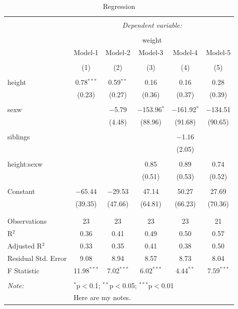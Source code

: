 \documentclass[
  doc]{apa6}
\begin{document}
\begin{table}[!htbp] \centering 
  \caption{Regression} 
  \label{} 
\small 
\begin{tabular}{@{\extracolsep{5pt}}lccccc} 
\\[-1.8ex]\hline 
\hline \\[-1.8ex] 
 & \multicolumn{5}{c}{\textit{Dependent variable:}} \\ 
\cline{2-6} 
\\[-1.8ex] & \multicolumn{5}{c}{weight} \\ 
 & Model-1 & Model-2 & Model-3 & Model-4 & Model-5 \\ 
\\[-1.8ex] & (1) & (2) & (3) & (4) & (5)\\ 
\hline \\[-1.8ex] 
 height & 0.78$^{***}$ & 0.59$^{**}$ & 0.16 & 0.16 & 0.28 \\ 
  & (0.23) & (0.27) & (0.36) & (0.37) & (0.39) \\ 
  & & & & & \\ 
 sexw &  & $-$5.79 & $-$153.96$^{*}$ & $-$161.92$^{*}$ & $-$134.51 \\ 
  &  & (4.48) & (88.96) & (91.68) & (90.65) \\ 
  & & & & & \\ 
 siblings &  &  &  & $-$1.16 &  \\ 
  &  &  &  & (2.05) &  \\ 
  & & & & & \\ 
 height:sexw &  &  & 0.85 & 0.89 & 0.74 \\ 
  &  &  & (0.51) & (0.53) & (0.52) \\ 
  & & & & & \\ 
 Constant & $-$65.44 & $-$29.53 & 47.14 & 50.27 & 27.69 \\ 
  & (39.35) & (47.66) & (64.81) & (66.23) & (70.36) \\ 
  & & & & & \\ 
\hline \\[-1.8ex] 
Observations & 23 & 23 & 23 & 23 & 21 \\ 
R$^{2}$ & 0.36 & 0.41 & 0.49 & 0.50 & 0.57 \\ 
Adjusted R$^{2}$ & 0.33 & 0.35 & 0.41 & 0.38 & 0.50 \\ 
Residual Std. Error & 9.08 & 8.94 & 8.57 & 8.73 & 8.04 \\ 
F Statistic & 11.98$^{***}$ & 7.02$^{***}$ & 6.02$^{***}$ & 4.44$^{**}$ & 7.59$^{***}$ \\ 
\hline 
\hline \\[-1.8ex] 
\textit{Note:}  & \multicolumn{5}{l}{$^{*}$p$<$0.1; $^{**}$p$<$0.05; $^{***}$p$<$0.01} \\ 
 & \multicolumn{5}{l}{Here are my notes.} \\ 
\end{tabular} 
\end{table}
\end{document}
